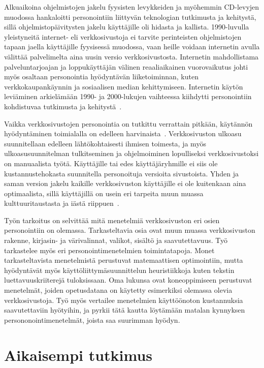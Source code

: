 \documentclass[finnish, 12pt, a4paper, elec, utf8, a-1b, online]{aaltothesis}
\begin{document}
Alkuaikoina ohjelmistojen jakelu fyysisten levykkeiden ja myöhemmin CD-levyjen
muodossa hankaloitti personointiin liittyvän teknologian tutkimusta ja
kehitystä, sillä ohjelmistopäivitysten jakelu käyttäjille oli hidasta ja
kallista. 1990-luvulla yleistyneitä internet- eli verkkosivustoja ei tarvite
perinteisten ohjelmistojen tapaan jaella käyttäjille fyysisessä muodossa, vaan
heille voidaan internetin avulla välittää palvelimelta aina uusin versio
verkkosivustosta. Internetin mahdollistama palveluntarjoajan ja loppukäyttäjän
välinen reaaliaikainen vuorovaikutus johti myös osaltaan personointia
hyödyntävän liiketoiminnan, kuten verkkokaupankäynnin ja sosiaalisen median
kehittymiseen. Internetin käytön leviäminen arkielämään 1990- ja 2000-lukujen
vaihteessa kiihdytti personointiin kohdistuvaa tutkimusta ja
kehitystä~\cite{10.1108/03090560710737534}.

Vaikka verkkosivustojen personointia on tutkittu verrattain pitkään, käytännön
hyödyntäminen toimialalla on edelleen harvinaista~\cite{viite puuttuu}.
Verkkosivuston ulkoasu suunnitellaan edelleen lähtökohtaisesti ihmisen toimesta,
ja myös ulkoasusuunnitelman tulkitseminen ja ohjelmoiminen lopulliseksi
verkkosivustoksi on manuaalista työtä. Käyttäjille tai edes käyttäjäryhmille ei
siis ole kustannustehokasta suunnitella personoituja versioita sivustoista.
Yhden ja saman version jakelu kaikille verkkosivuston käyttäjille ei ole
kuitenkaan aina optimaalista, sillä käyttäjillä on usein eri tarpeita muun
muassa kulttuuritaustasta ja iästä riippuen~\cite{viite puuttuu}.

Työn tarkoitus on selvittää mitä menetelmiä verkkosivuston eri osien
personointiin on olemassa. Tarkasteltavia osia ovat muun muassa verkkosivuston
rakenne, kirjasin- ja värivalinnat, valikot, sisältö ja saavutettavuus. Työ
tarkastelee myös eri personointimenetelmien toimintatapoja. Monet
tarkasteltavista menetelmistä perustuvat matemaattisen optimointiin, mutta
hyödyntävät myös käyttöliittymäsuunnittelun heuristiikkoja kuten tekstin
luettavuuskriiterejä tuloksissaan. Oma lukunsa ovat koneoppimiseen perustuvat
menetelmät, joiden opetusdatana on käytetty esimerkiksi olemassa olevia
verkkosivustoja. Työ myös vertailee menetelmien käyttöönoton kustannuksia
saavutettaviin hyötyihin, ja pyrkii tätä kautta löytämään matalan kynnyksen
persononointimenetelmät, joista saa suurimman hyödyn.

\clearpage

\section{Aikaisempi tutkimus}
\end{document}
